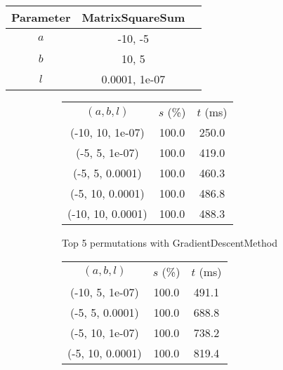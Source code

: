 \begin{center}
\label{tab:params_GoldenSectionSearch}
\begin{tabular}{|c|c|c|}
\hline
\rowcolor{gray!25}
Parameter & MatrixSquareSum \\
\hline
$a$ & -10, -5 \\
$b$ & 10, 5 \\
$l$ & 0.0001, 1e-07 \\
\hline
\end{tabular}
\end{center}

\begin{figure}[H]
\label{fig:param_comp_GoldenSectionSearch}
\begin{subfigure}[ht]{.5\textwidth}
\begin{tabular}{|c|c|c|}
\hline
\rowcolor{gray!25}
\multicolumn{3}{|c|}{GradientDescentMethod} \\
\hline
\rowcolor{gray!25}
$(a,b,l)$ & $s$ (\%) & $t$ (ms) \\
\hline
(-10, 10, 1e-07) & 100.0 & 250.0 \\
(-5, 5, 1e-07) & 100.0 & 419.0 \\
(-5, 5, 0.0001) & 100.0 & 460.3 \\
(-5, 10, 0.0001) & 100.0 & 486.8 \\
(-10, 10, 0.0001) & 100.0 & 488.3 \\
\hline
\end{tabular}
\caption{Top 5 permutations with GradientDescentMethod}
\label{subfig:param_comp_GoldenSectionSearch_GradientDescentMethod}
\end{subfigure}
\hfill
\begin{subfigure}[ht]{.5\textwidth}
\begin{tabular}{|c|c|c|}
\hline
\rowcolor{gray!25}
\multicolumn{3}{|c|}{NewtonsMethod} \\
\hline
\rowcolor{gray!25}
$(a,b,l)$ & $s$ (\%) & $t$ (ms) \\
\hline
(-10, 5, 1e-07) & 100.0 & 491.1 \\
(-5, 5, 0.0001) & 100.0 & 688.8 \\
(-5, 10, 1e-07) & 100.0 & 738.2 \\
(-5, 10, 0.0001) & 100.0 & 819.4 \\

\end{tabular}
\end{subfigure}
\end{figure}
